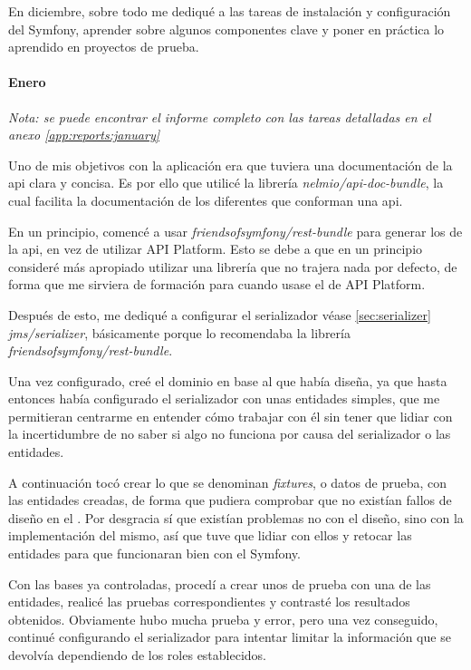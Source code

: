 En diciembre, sobre todo me dediqué a las tareas de instalación y configuración
del  Symfony, aprender sobre algunos componentes clave
y poner en práctica lo aprendido en proyectos de prueba.

\paragraph{Enero}
\label{sec:tnc:jan}
\textit{Nota: se puede encontrar el informe completo con las tareas detalladas
en el anexo \ref{app:reports:january}}

Uno de mis objetivos con la aplicación era que tuviera una documentación de la
\gls{api} clara y concisa. Es por ello que utilicé la librería
\textit{nelmio/api-doc-bundle}, la cual facilita la documentación de los
diferentes  que conforman una \gls{api}.

En un principio, comencé a usar \textit{friendsofsymfony/rest-bundle} para
generar los  de la \gls{api}, en vez de utilizar
API Platform. Esto se debe a que en un principio consideré más apropiado utilizar
una librería que no trajera nada por defecto, de forma que me sirviera de formación
para cuando usase el  de API Platform.

Después de esto, me dediqué a configurar el serializador \textemdash véase
\ref{sec:serializer} \textemdash \textit{jms/serializer}, básicamente porque
lo recomendaba la librería \\ \textit{friendsofsymfony/rest-bundle}.

Una vez configurado, creé el dominio en base al  que había diseña, ya que hasta entonces había configurado
el serializador con unas entidades simples, que me permitieran centrarme en
entender cómo trabajar con él sin tener que lidiar con la incertidumbre de
no saber si algo no funciona por causa del serializador o las entidades.

A continuación tocó crear lo que se denominan \textit{fixtures}, o datos de
prueba, con las entidades creadas, de forma que pudiera comprobar que no
existían fallos de diseño en el .
Por desgracia sí que existían problemas no con el diseño, sino con la
implementación del mismo, así que tuve que lidiar con ellos y retocar las
entidades para que funcionaran bien con el 
Symfony.

Con las bases ya controladas, procedí a crear unos 
de prueba con una de las entidades, realicé las pruebas correspondientes y contrasté
los resultados obtenidos. Obviamente hubo mucha prueba y error, pero una vez
conseguido, continué configurando el serializador para intentar limitar la
información que se devolvía dependiendo de los roles establecidos.

